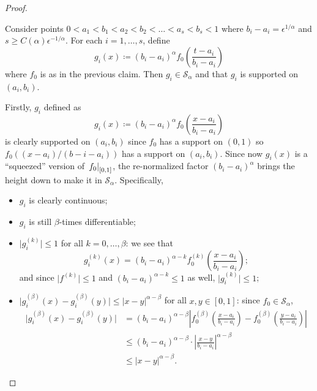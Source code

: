 \begin{proof}
	\begin{claim}
		Consider points \(0 < a_1 < b_1 < a_2 < b_2 < \dots < a_s < b_s < 1\) where \(b_i - a_i = \epsilon ^{1 / \alpha }\) and \(s \geq C(\alpha ) \epsilon ^{-1 / \alpha }\). For each \(i = 1, \dots , s\), define
		\[
			g_i(x) \coloneqq (b_i - a_i)^{\alpha } f_0 \left( \frac{t-a_i}{b_i - a_i} \right)
		\]
		where \(f_0\) is as in the previous claim. Then \(g_i \in \mathcal{S} _\alpha \) and that \(g_i\) is supported on \((a_i , b_i)\).
	\end{claim}
	\begin{explanation}
		Firstly, \(g_i\) defined as
		\[
			g_i(x) \coloneqq (b_i - a_i)^\alpha f_0 \left( \frac{x-a_i}{b_i - a_i} \right)
		\]
		is clearly supported on \((a_i, b_i)\) since \(f_0\) has a support on \((0, 1)\) so \(f_0((x - a_i) / (b-i - a_i))\) has a support on \((a_i, b_i)\). Since now \(g_i(x)\) is a ``squeezed'' version of \(\left.f_0\right\vert_{[0, 1]}^{} \), the re-normalized factor \((b_i - a_i)^\alpha \) brings the height down to make it in \(\mathcal{S} _\alpha \). Specifically,
		\begin{itemize}
			\item \(g_i\) is clearly continuous;
			\item \(g_i\) is still \(\beta \)-times differentiable;
			\item \(\vert g_i^{(k)} \vert \leq 1\) for all \(k = 0, \dots , \beta \): we see that
			      \[
				      g_i^{(k)} (x)
				      = (b_i - a_i)^{\alpha - k} f_{0} ^{(k)}\left( \frac{x-a_i}{b_i - a_i} \right) ;
			      \]
			      and since \(\vert f^{(k)} \vert \leq 1\) and \((b_i - a_i)^{\alpha - k} \leq 1\) as well, \(\vert g_i^{(k)} \vert \leq 1\);
			\item \(\vert g_i^{(\beta )}(x) - g_i^{(\beta )}(y) \vert \leq \vert x - y \vert ^{\alpha - \beta }\) for all \(x, y\in [0, 1]\): since \(f_0 \in \mathcal{S} _\alpha \),
			      \[
				      \begin{split}
					      \vert g_i^{(\beta )}(x) - g_i^{(\beta )}(y) \vert
					       & = (b_i - a_i)^{\alpha - \beta} \left\vert f_{0}^{(\beta )} \left( \frac{x-a_i}{b_i - a_i} \right) - f_{0}^{(\beta )} \left( \frac{y-a_i}{b_i - a_i} \right) \right\vert \\
					       & \leq (b_i - a_i)^{\alpha - \beta } \cdot \left\vert \frac{x - y}{b_i - a_i} \right\vert ^{\alpha - \beta }                                                              \\
					       & \leq \vert x - y \vert ^{\alpha -\beta }.
				      \end{split}
			      \]
		\end{itemize}


\end{explanation}
\end{proof}
